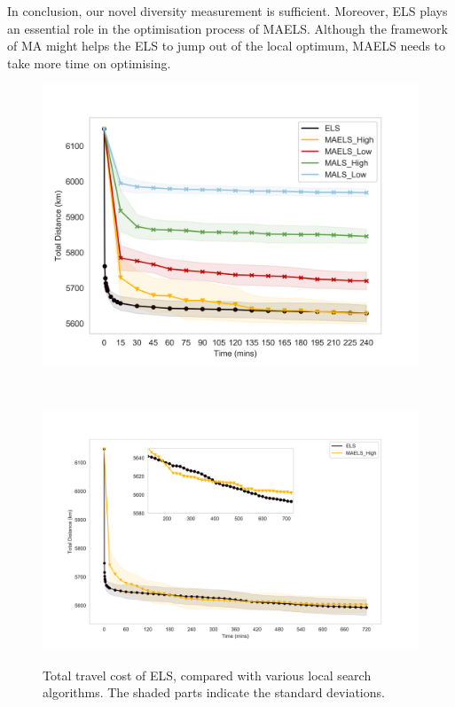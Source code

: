 \documentclass[journal]{IEEEtran}
\begin{document}
In conclusion, our novel diversity measurement is sufficient. Moreover, ELS plays an essential role in the optimisation process of MAELS. Although the framework of MA might helps the ELS to jump out of the local optimum, MAELS needs to take more time on optimising.

\begin{figure}[htbp]
	\centering
	\begin{subfloat}{
	\includegraphics[width=1\columnwidth]{maels.png}}
    \end{subfloat}\\
    \begin{subfloat}{
	\includegraphics[width=1\columnwidth]{maels_12.png}}
    \end{subfloat}
    \caption{Total travel cost of ELS, compared with various local search algorithms. The shaded parts indicate the standard deviations.}
\end{figure}
\end{document}
